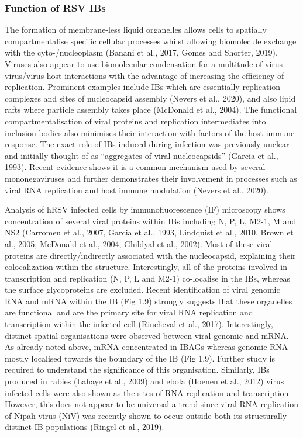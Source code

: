 \subsubsection{Function of RSV IBs} \label{Function of RSV IBs}
The formation of membrane-less liquid organelles allows cells to spatially compartmentalise specific cellular processes whilst allowing biomolecule exchange with the cyto-/nucleoplasm (Banani et al., 2017, Gomes and Shorter, 2019). Viruses also appear to use biomolecular condensation for a multitude of virus-virus/virus-host interactions with the advantage of increasing the efficiency of replication. Prominent examples include IBs which are essentially replication complexes and sites of nucleocapsid assembly (Nevers et al., 2020), and also lipid rafts where particle assembly takes place (McDonald et al., 2004). The functional compartmentalisation of viral proteins and replication intermediates into inclusion bodies also minimises their interaction with factors of the host immune response. The exact role of IBs induced during infection was previously unclear and initially thought of as “aggregates of viral nucleocapsids” (Garcia et al., 1993). Recent evidence shows it is a common mechanism used by several mononegaviruses and further demonstrates their involvement in processes such as viral RNA replication and host immune modulation (Nevers et al., 2020).

Analysis of hRSV infected cells by immunofluorescence (IF) microscopy shows concentration of several viral proteins within IBs including N, P, L, M2-1, M and NS2 (Carromeu et al., 2007, Garcia et al., 1993, Lindquist et al., 2010, Brown et al., 2005, McDonald et al., 2004, Ghildyal et al., 2002). Most of these viral proteins are directly/indirectly associated with the nucleocapsid, explaining their colocalization within the structure. Interestingly, all of the proteins involved in transcription and replication (N, P, L and M2-1) co-localise in the IBs, whereas the surface glycoproteins are excluded. Recent identification of viral genomic RNA and mRNA within the IB (Fig 1.9) strongly suggests that these organelles are functional and are the primary site for viral RNA replication and transcription within the infected cell (Rincheval et al., 2017). Interestingly, distinct spatial organisations were observed between viral genomic and mRNA. As already noted above, mRNA concentrated in IBAGs whereas genomic RNA mostly localised towards the boundary of the IB (Fig 1.9). Further study is required to understand the significance of this organisation. Similarly, IBs produced in rabies (Lahaye et al., 2009) and ebola (Hoenen et al., 2012) virus infected cells were also shown as the sites of RNA replication and transcription. However, this does not appear to be universal a trend since viral RNA replication of Nipah virus (NiV) was recently shown to occur outside both its structurally distinct IB populations (Ringel et al., 2019).


